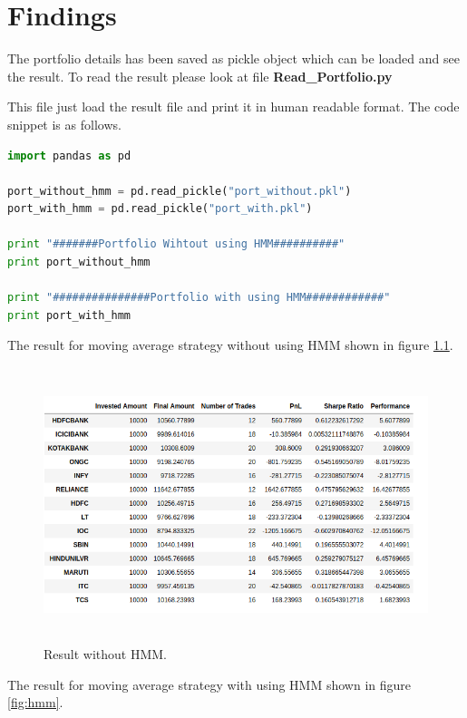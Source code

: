 \documentclass{report}
\begin{document}
\chapter{Findings}
The portfolio details has been saved as pickle object which can be loaded and see the result. To read the result please look at file \textbf{Read\_Portfolio.py}

This file just load the result file and print it in human readable format. The code snippet is as follows.
\begin{lstlisting}[language=Python]
import pandas as pd

port_without_hmm = pd.read_pickle("port_without.pkl")
port_with_hmm = pd.read_pickle("port_with.pkl")

print "#######Portfolio Wihtout using HMM##########"
print port_without_hmm

print "###############Portfolio with using HMM############"
print port_with_hmm

\end{lstlisting}

\newpage
The result for moving average strategy without using HMM shown in figure \ref{fig:no_hmm}.

\begin{figure}[h!]
  \includegraphics[width=15cm, height=8cm]{Result_Without_HMM.png}
  \caption{Result without HMM.}
  \label{fig:no_hmm}
\end{figure}

\newpage
The result for moving average strategy with using HMM shown in figure \ref{fig:hmm}.
\end{document}
